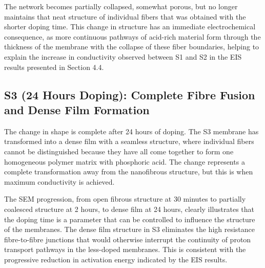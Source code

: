 \documentclass[12pt,a4paper]{report}
\begin{document}
The network becomes partially collapsed, somewhat porous, but no longer maintains that neat structure of individual fibers that was obtained with the shorter doping time. This change in structure has an immediate electrochemical consequence, as more continuous pathways of acid-rich material form through the thickness of the membrane with the collapse of these fiber boundaries, helping to explain the increase in conductivity observed between S1 and S2 in the EIS results presented in Section 4.4.\cite{52, 58}

\subsection{S3 (24 Hours Doping): Complete Fibre Fusion and Dense Film Formation}
The change in shape is complete after 24 hours of doping. The S3 membrane has transformed into a dense film with a seamless structure, where individual fibers cannot be distinguished because they have all come together to form one homogeneous polymer matrix with phosphoric acid. The change represents a complete transformation away from the nanofibrous structure, but this is when maximum conductivity is achieved.\cite{52,58}

The SEM progression, from open fibrous structure at 30 minutes to partially coalesced structure at 2 hours, to dense film at 24 hours, clearly illustrates that the doping time is a parameter that can be controlled to influence the structure of the membranes. The dense film structure in S3 eliminates the high resistance fibre-to-fibre junctions that would otherwise interrupt the continuity of proton transport pathways in the less-doped membranes. This is consistent with the progressive reduction in activation energy indicated by the EIS results.\cite{35,52,58}
\end{document}
